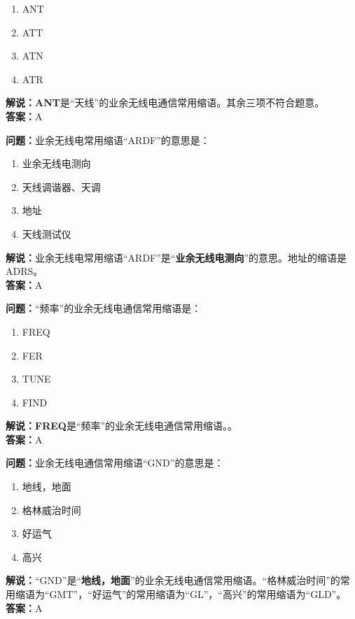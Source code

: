 \begin{enumerate}[label=\Alph*), leftmargin=1cm]
	\item ANT
	\item ATT
	\item ATN
	\item ATR
\end{enumerate}

\textbf{解说：}\textbf{ANT}是“天线”的业余无线电通信常用缩语。其余三项不符合题意。\\\textbf{答案：}A



\textbf{问题：}业余无线电常用缩语“ARDF”的意思是：

\begin{enumerate}[label=\Alph*), leftmargin=1cm]
	\item 业余无线电测向
	\item 天线调谐器、天调
	\item 地址
	\item 天线测试仪
\end{enumerate}

\textbf{解说：}业余无线电常用缩语“ARDF”是“\textbf{业余无线电测向}”的意思。地址的缩语是ADRS。\\\textbf{答案：}A



\textbf{问题：}“频率”的业余无线电通信常用缩语是：
\begin{enumerate}[label=\Alph*), leftmargin=1cm]
	\item FREQ
	\item FER
	\item TUNE
	\item FIND
\end{enumerate}

\textbf{解说：}\textbf{FREQ}是“频率”的业余无线电通信常用缩语。。\\\textbf{答案：}A



\textbf{问题：}业余无线电通信常用缩语“GND”的意思是：

\begin{enumerate}[label=\Alph*), leftmargin=1cm]
	\item 地线，地面
	\item 格林威治时间
	\item 好运气
	\item 高兴
\end{enumerate}

\textbf{解说：}“GND”是“\textbf{地线，地面}”的业余无线电通信常用缩语。“格林威治时间”的常用缩语为“GMT”，“好运气”的常用缩语为“GL”，“高兴”的常用缩语为“GLD”。\\\textbf{答案：}A



